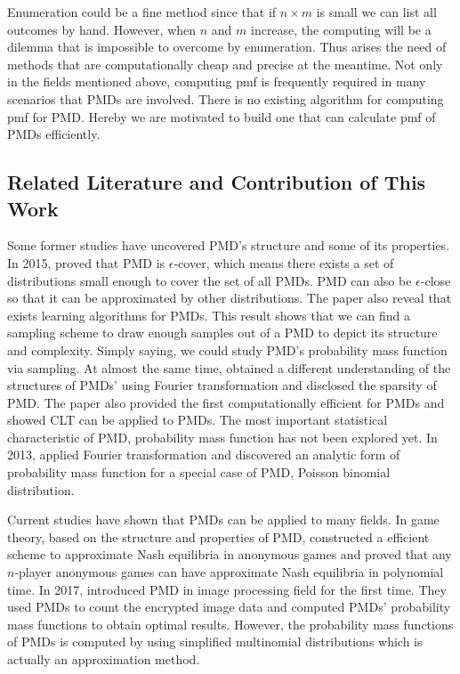 \documentclass[12pt]{article}
\newcommand{\PMD}{\textrm{PMD}}
\begin{document}
Enumeration could be a fine method since that if $n \times m$ is small we can list all outcomes by hand. However, when $n$ and $m$ increase, the computing will be a dilemma that is impossible to overcome by enumeration. Thus arises the need of methods that are computationally cheap and precise at the meantime. Not only in the fields mentioned above, computing pmf is frequently required in many scenarios that $\PMD$s are involved. There is no existing algorithm for computing pmf for PMD. Hereby we are motivated to build one that can calculate pmf of $\PMD$s efficiently.



\subsection{Related Literature and Contribution of This Work}


Some former studies have uncovered $\PMD$'s structure and some of its properties. In 2015,  proved that $\PMD$ is $\epsilon$-cover, which means there exists a set of distributions small enough to cover the set of all $\PMD$s. $\PMD$ can also be $\epsilon$-close so that it can be approximated by other distributions. The paper also reveal that exists learning algorithms for $\PMD$s. This result shows that we can find a sampling scheme to draw enough samples out of a $\PMD$ to depict its structure and complexity. Simply saying, we could study $\PMD$'s probability mass function via sampling. At almost the same time,  obtained a different understanding of the structures of $\PMD$s' using Fourier transformation and disclosed the sparsity of $\PMD$. The paper also provided the first computationally efficient for $\PMD$s and showed CLT can be applied to $\PMD$s. The most important statistical characteristic of $\PMD$, probability mass function has not been explored yet. In 2013,  applied Fourier transformation and discovered an analytic form of probability mass function for a special case of $\PMD$, Poisson binomial distribution.

Current studies have shown that $\PMD$s can be applied to many fields. In game theory, based on the structure and properties of $\PMD$,  constructed a efficient scheme to approximate Nash equilibria in anonymous games and  proved that any $n$-player anonymous games can have approximate Nash equilibria in polynomial time. In 2017,  introduced $\PMD$ in image processing field for the first time. They used $\PMD$s to count the encrypted image data and computed $\PMD$s' probability mass functions to obtain optimal results. However, the probability mass functions of $\PMD$s is computed by using simplified multinomial distributions which is actually an approximation method.
\end{document}

